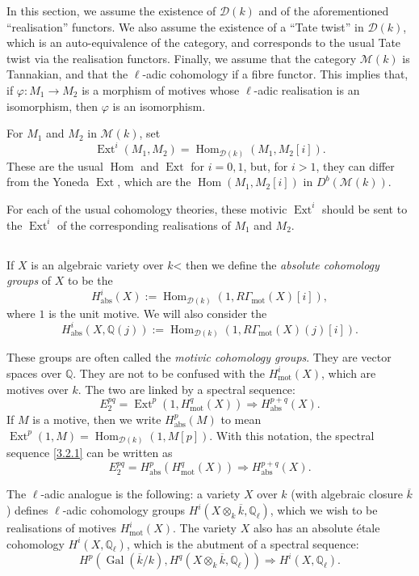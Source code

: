 \documentclass{article}
\theoremstyle{plain}
\theoremstyle{definition}
\newcommand{\sh}[1]{{\mathscr{#1}}}
\newcommand{\QQ}{\mathbb{Q}}
\newcommand{\mot}{\mathrm{mot}}
\newcommand{\abs}{\mathrm{abs}}
\DeclareMathOperator{\Hom}{Hom}
\DeclareMathOperator{\Ext}{Ext}
\DeclareMathOperator{\Gal}{Gal}
\newcommand{\oldpage}[1]{\marginpar{\footnotesize$\Big\vert$ \textit{p.~#1}}}
\begin{document}
In this section, we assume the existence of $\sh{D}(k)$ and of the aforementioned ``realisation'' functors.
We also assume the existence of a ``Tate twist'' in $\sh{D}(k)$, which is an auto-equivalence of the category, and corresponds to the usual Tate twist via the realisation functors.
Finally, we assume that the category $\sh{M}(k)$ is Tannakian, and that the $\ell$-adic cohomology if a fibre functor.
This implies that, if $\varphi\colon M_1\to M_2$ is a morphism of motives whose $\ell$-adic realisation is an isomorphism, then $\varphi$ is an isomorphism.

For $M_1$ and $M_2$ in $\sh{M}(k)$, set
\[
  \Ext^i(M_1,M_2) = \Hom_{\sh{D}(k)}(M_1,M_2[i]).
\]
\oldpage{155}
These are the usual $\Hom$ and $\Ext$ for $i=0,1$, but, for $i>1$, they can differ from the Yoneda $\Ext$, which are the $\Hom(M_1,M_2[i])$ in $D^b(\sh{M}(k))$.

For each of the usual cohomology theories, these motivic $\Ext^i$ should be sent to the $\Ext^i$ of the corresponding realisations of $M_1$ and $M_2$.


\subsection{}
\label{3.2}

If $X$ is an algebraic variety over $k$< then we define the \emph{absolute cohomology groups} of $X$ to be the
\[
  H^i_\abs(X) := \Hom_{\sh{D}(k)}(1,R\Gamma_\mot(X)[i]),
\]
where $1$ is the unit motive.
We will also consider the
\[
  H^i_\abs(X,\QQ(j)) := \Hom_{\sh{D}(k)}(1,R\Gamma_\mot(X)(j)[i]).
\]

These groups are often called the \emph{motivic cohomology groups}.
They are vector spaces over $\QQ$.
They are not to be confused with the $H^i_\mot(X)$, which are motives over $k$.
The two are linked by a spectral sequence:
\[
\label{3.2.1}
  E_2^{pq} = \Ext^p(1,H_\mot^q(X)) \Rightarrow H_\abs^{p+q}(X).
\tag{3.2.1}
\]
If $M$ is a motive, then we write $H^p_\abs(M)$ to mean $\Ext^p(1,M)=\Hom_{\sh{D}(k)}(1,M[p])$.
With this notation, the spectral sequence \cref{3.2.1} can be written as
\[
\label{3.2.2}
  E_2^{pq} = H_\abs^p(H_\mot^q(X)) \Rightarrow H_\abs^{p+q}(X).
\tag{3.2.2}
\]

The $\ell$-adic analogue is the following:
a variety $X$ over $k$ (with algebraic closure $\overline{k}$) defines $\ell$-adic cohomology groups $H^i(X\otimes_k\overline{k},\QQ_\ell)$, which we wish to be realisations of motives $H_\mot^i(X)$.
The variety $X$ also has an absolute \'{e}tale cohomology $H^i(X,\QQ_\ell)$, which is the abutment of a spectral sequence:
\[
  H^p(\Gal(\overline{k}/k), H^q(X\otimes_k\overline{k},\QQ_\ell)) \Rightarrow H^i(X,\QQ_\ell).
\]
\end{document}
